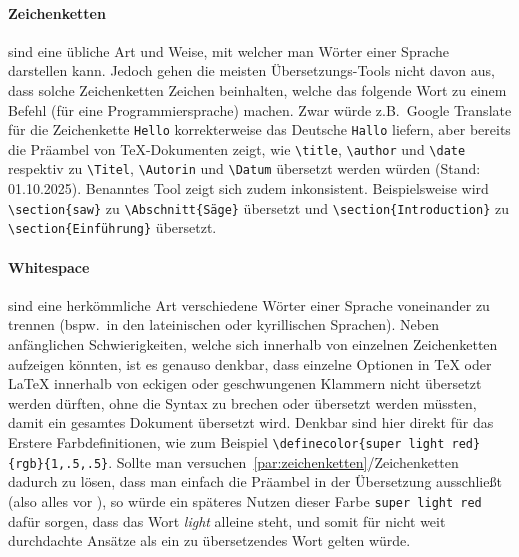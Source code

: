 \paragraph*{Zeichenketten\label{par:zeichenketten}} sind eine übliche Art und Weise, mit welcher man Wörter einer Sprache darstellen kann. Jedoch gehen die meisten Übersetzungs-Tools nicht davon aus, dass solche Zeichenketten Zeichen beinhalten, welche das folgende Wort zu einem Befehl (für eine Programmiersprache) machen. Zwar würde z.B.\ Google Translate für die Zeichenkette \texttt{Hello} korrekterweise das Deutsche \texttt{Hallo} liefern, aber bereits die Präambel von \TeX{}-Dokumenten zeigt, wie \verb|\title|, \verb|\author| und \verb|\date| respektiv zu \verb|\Titel|, \verb|\Autorin| und \verb|\Datum| übersetzt werden würden (Stand: 01.10.2025). Benanntes Tool zeigt sich zudem inkonsistent. Beispielsweise wird \verb|\section{saw}| zu \verb|\Abschnitt{Säge}| übersetzt und \verb|\section{Introduction}| zu \verb|\section{Einführung}| übersetzt. 

\paragraph*{Whitespace\label{par:zeichenketten}} sind eine herkömmliche Art verschiedene Wörter einer Sprache voneinander zu trennen (bspw.\ in den lateinischen oder kyrillischen Sprachen). Neben anfänglichen Schwierigkeiten, welche sich innerhalb von einzelnen Zeichenketten aufzeigen könnten, ist es genauso denkbar, dass einzelne Optionen in \TeX{} oder \LaTeX{} innerhalb von eckigen oder geschwungenen Klammern nicht übersetzt werden dürften, ohne die Syntax zu brechen oder übersetzt werden müssten, damit ein gesamtes Dokument übersetzt wird. Denkbar sind hier direkt für das Erstere Farbdefinitionen, wie zum Beispiel \verb|\definecolor{super light red}{rgb}{1,.5,.5}|. Sollte man versuchen~\ref{par:zeichenketten}/Zeichenketten dadurch zu lösen, dass man einfach die Präambel in der Übersetzung ausschließt (also alles vor \verb||), so würde ein späteres Nutzen dieser Farbe \texttt{super light red} dafür sorgen, dass das Wort \textit{light} alleine steht, und somit für nicht weit durchdachte Ansätze als ein zu übersetzendes Wort gelten würde. 

